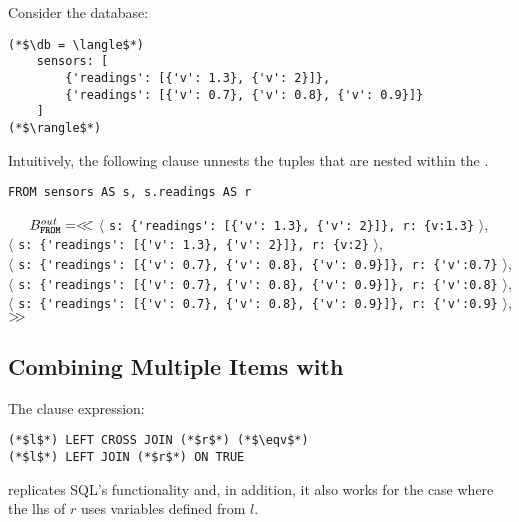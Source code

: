 \begin{example}
Consider the database:

\begin{lstlisting}
(*$\db = \langle$*)
    sensors: [
        {'readings': [{'v': 1.3}, {'v': 2}]},
        {'readings': [{'v': 0.7}, {'v': 0.8}, {'v': 0.9}]}
    ]
(*$\rangle$*)
\end{lstlisting}

\noindent Intuitively, the following \from clause unnests the tuples that are
nested within the .

\begin{lstlisting}
FROM sensors AS s, s.readings AS r
\end{lstlisting}

\begin{tabbing}
\ \ \ $B^{out}_{\texttt{\textbf{FROM}}} = <\!\!<$\=
  $\langle$ \lstinline|s: {'readings': [{'v': 1.3}, {'v': 2}]}, r: {v:1.3}| $\rangle$,\\
\>$\langle$ \lstinline|s: {'readings': [{'v': 1.3}, {'v': 2}]}, r: {v:2}| $\rangle$,\\
\>$\langle$ \lstinline|s: {'readings': [{'v': 0.7}, {'v': 0.8}, {'v': 0.9}]}, r: {'v':0.7}| $\rangle$,\\
\>$\langle$ \lstinline|s: {'readings': [{'v': 0.7}, {'v': 0.8}, {'v': 0.9}]}, r: {'v':0.8}| $\rangle$,\\
\>$\langle$ \lstinline|s: {'readings': [{'v': 0.7}, {'v': 0.8}, {'v': 0.9}]}, r: {'v':0.9}| $\rangle$,\\
\>$>\!\!>$
\end{tabbing}
\end{example}

\subsection{Combining Multiple \from Items with \LEFTJOIN}
\label{sec:combining-multiple-item-leftjoin}

The \from clause expression:

\begin{lstlisting}
(*$l$*) LEFT CROSS JOIN (*$r$*) (*$\eqv$*)
(*$l$*) LEFT JOIN (*$r$*) ON TRUE
\end{lstlisting}

\noindent replicates SQL's  functionality and, in addition, it
also works for the case where the lhs of $r$ uses variables defined from $l$.


